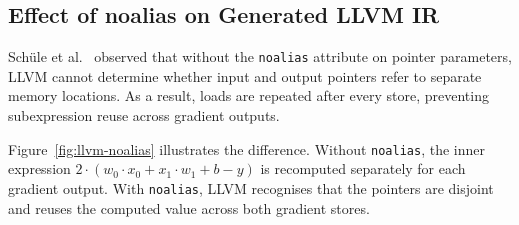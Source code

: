 \documentclass[12pt]{report}
\begin{document}
\subsection{Effect of noalias on Generated LLVM IR}

Schüle et al.~\cite{schule2022llvm} observed that without the
\texttt{noalias} attribute on pointer parameters, LLVM cannot
determine whether input and output pointers refer to separate
memory locations. As a result, loads are repeated after every store,
preventing subexpression reuse across gradient outputs.

Figure~\ref{fig:llvm-noalias} illustrates the difference. Without
\texttt{noalias}, the inner expression
$2 \cdot (w_0 \cdot x_0 + x_1 \cdot w_1 + b - y)$
is recomputed separately for each gradient output. With
\texttt{noalias}, LLVM recognises that the pointers are disjoint
and reuses the computed value across both gradient stores.
\end{document}
